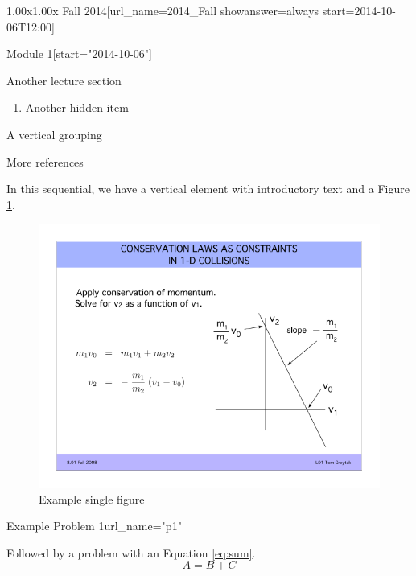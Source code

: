 \documentclass[12pt]{article}
\begin{document}
\begin{edXcourse}{1.00x}{1.00x Fall 2014}[url_name=2014_Fall showanswer=always start=2014-10-06T12:00]
\begin{edXchapter}{Module 1}[start="2014-10-06"]
\begin{edXsequential}{Another lecture section}
\begin{enumerate}
  \item Another hidden item \label{it:random}
\end{enumerate}

\begin{edXvertical}{A vertical grouping}
\label{subsec:group1}

\begin{edXtext}{More references}

In this sequential, we have a vertical element with introductory text and a Figure \ref{fig:examplefig}.
\begin{figure}
  \begin{center}
    \includegraphics{example-image.png}
    \caption{Example single figure}
    \label{fig:examplefig}
  \end{center}
\end{figure}

\end{edXtext}

\begin{edXproblem}{Example Problem 1}{url_name="p1"}

Followed by a problem with an Equation \ref{eq:sum}.
\begin{equation}
  \boxed{A = B + C}
  \label{eq:sum}
\end{equation}

\end{edXproblem}

\end{edXvertical}

\end{edXsequential}

\end{edXchapter}

\end{edXcourse}
\end{document}
